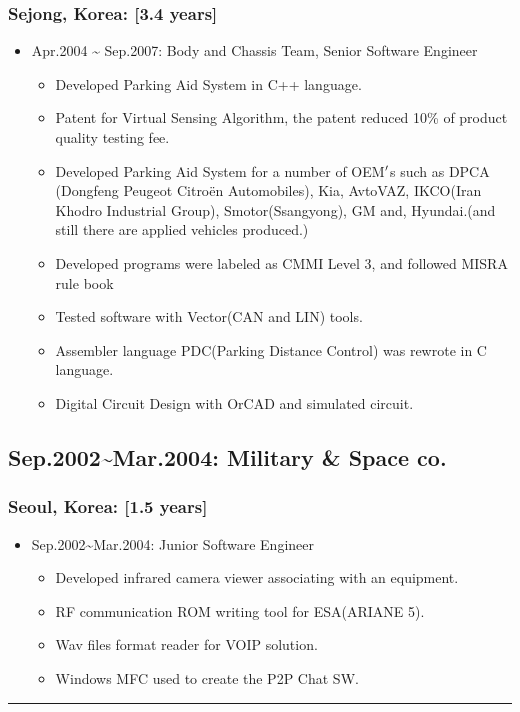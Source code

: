 \documentclass[12pt,a4paper]{article}
\begin{document}
\subsubsection{Sejong, Korea: [3.4 years]}
\begin{itemize}
\item Apr.2004 {\textasciitilde} Sep.2007: Body and Chassis Team, Senior Software Engineer

\begin{itemize}
\item Developed Parking Aid System in C++ language.


\item Patent for Virtual Sensing Algorithm, the patent reduced 10\% of product quality testing fee.


\item Developed Parking Aid System for a number of OEM\ensuremath{\rq}s such as DPCA (Dongfeng Peugeot Citroën Automobiles), Kia, AvtoVAZ, IKCO(Iran Khodro Industrial Group), Smotor(Ssangyong), GM and, Hyundai.(and still there are applied vehicles produced.)


\item Developed programs were labeled as CMMI Level 3, and followed MISRA rule book


\item Tested software with Vector(CAN and LIN) tools.


\item Assembler language PDC(Parking Distance Control) was rewrote in C language.


\item Digital Circuit Design with OrCAD and simulated circuit.

\end{itemize}
\end{itemize}
\subsection{Sep.2002{\textasciitilde}Mar.2004: Military \& Space co.}
\subsubsection{Seoul, Korea: [1.5 years]}
\begin{itemize}
\item Sep.2002{\textasciitilde}Mar.2004: Junior Software Engineer

\begin{itemize}
\item Developed infrared camera viewer associating with an equipment.


\item RF communication ROM writing tool for ESA(ARIANE 5).


\item Wav files format reader for VOIP solution.


\item Windows MFC used to create the P2P Chat SW. 

\end{itemize}
\end{itemize}
\rule{\textwidth}{1pt}
\end{document}
